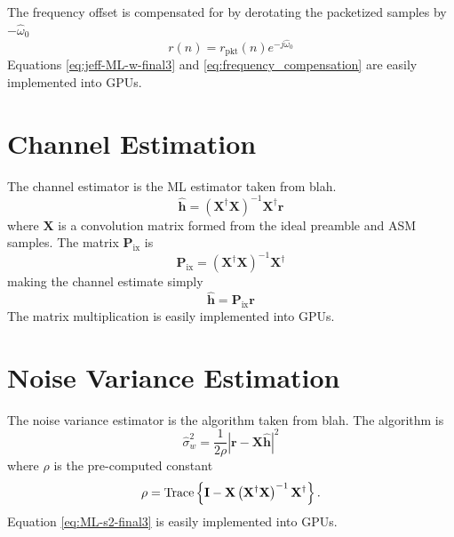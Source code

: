 The frequency offset is compensated for by derotating the packetized samples by $-\hat{\omega}_0$
\begin{equation}
	r(n) = r_\text{pkt}(n) e^{-j\hat{\omega}_0}
	\label{eq:frequency_compensation}
\end{equation}
Equations \eqref{eq:jeff-ML-w-final3} and \eqref{eq:frequency_compensation} are easily implemented into GPUs. 

\section{Channel Estimation}
\label{sec:channel_estimation}
The channel estimator is the ML estimator taken from blah.
\begin{equation}
\hat{\mathbf{h}} = \left( \mathbf{X}^\dag\mathbf{X} \right)^{-1} \mathbf{X}^\dag\mathbf{r}
\end{equation}
where $\mathbf{X}$ is a convolution matrix formed from the ideal preamble and ASM samples.
The matrix $\mathbf{P}_\text{ix}$ is
\begin{equation}
\mathbf{P}_\text{ix} = \left( \mathbf{X}^\dag\mathbf{X} \right)^{-1} \mathbf{X}^\dag
\end{equation}
making the channel estimate simply
\begin{equation}
\hat{\mathbf{h}} = \mathbf{P}_\text{ix} \mathbf{r}
\end{equation}
The matrix multiplication is easily implemented into GPUs.


\section{Noise Variance Estimation}
\label{sec:noise_variance_estimation}
The noise variance estimator is the algorithm taken from blah.
The algorithm is
\begin{equation}
	\hat{\sigma}_w^2 = \frac{1}{2\rho} \left| \mathbf{r}-\mathbf{X}\hat{\mathbf{h}}\right|^2
	\label{eq:ML-s2-final3}
\end{equation}
where $\rho$ is the pre-computed constant
\begin{equation}
	\rho = {\rm Trace} \left\{ \mathbf{I} -  \mathbf{X}\left(\mathbf{X}^\dag\mathbf{X}\right)^{-1}\mathbf{X}^\dag \right\}.
\end{equation}
Equation \eqref{eq:ML-s2-final3} is easily implemented into GPUs.
	

